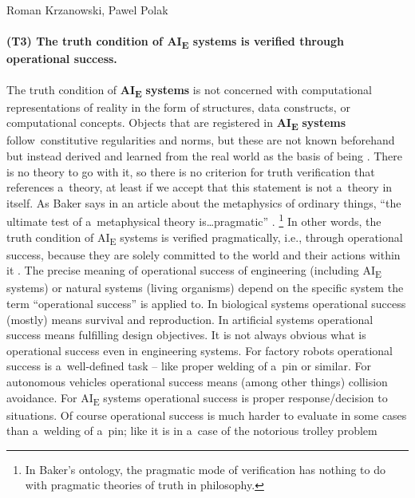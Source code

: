 \begin{artengenv2auth}{Roman Krzanowski, Pawel Polak}
\paragraph{(T3) The truth condition of AI\textsubscript{E} systems is verified through operational success.}
The truth condition of \textbf{AI}\textbf{\textsubscript{E}} \textbf{systems} is not concerned with computational representations of reality in the form of structures, data constructs, or computational concepts. Objects that are registered in \textbf{AI}\textbf{\textsubscript{E}} \textbf{systems} follow~constitutive regularities and norms, but these are not known beforehand but instead derived and learned from the real world as the basis of being
\parencite[][p.103]{smith_promise_2019}. %
 There is no theory to go with it, so there is no criterion for truth verification that references a~theory, at least if we accept that this statement is not a~theory in itself. As Baker says in an article about the metaphysics of ordinary things, ``the ultimate test of a~metaphysical theory is\ldots pragmatic'' 
\parencite[][p.11]{baker_metaphysics_2007}.%
\footnote{In Baker's ontology, the pragmatic mode of verification has nothing to do with pragmatic theories of truth in philosophy.} In other words, the truth condition of AI\textsubscript{E} systems is verified pragmatically, i.e., through operational success, because they are solely committed to the world and their actions within it 
\parencite[][p.145]{smith_promise_2019}. %
 The precise meaning of operational success of engineering (including AI\textsubscript{E} systems) or natural systems (living organisms) depend on the specific system the term ``operational success'' is applied to. In biological systems operational success (mostly) means survival and reproduction. In artificial systems operational success means fulfilling design objectives. It is not always obvious what is operational success even in engineering systems. For factory robots operational success is a~well-defined task -- like proper welding of a~pin or similar. For autonomous vehicles operational success means (among other things) collision avoidance. For AI\textsubscript{E} systems operational success is proper response/decision to situations. Of course operational success is much harder to evaluate in some cases than a~welding of a~pin; like it is in a~case of the notorious trolley problem 

\end{artengenv2auth}
